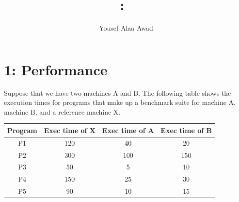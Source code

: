 \documentclass{article}
\title{
    \vspace{2in}
    \textmd{\textbf{\hmwkClass:\ \hmwkTitle}}\\
    \normalsize\vspace{0.1in}
    \vspace{3in}
}
\author{Yousef Alaa Awad}
\begin{document}
\maketitle
\pagebreak

\section{1: Performance}
Suppose that we have two machines A and B. The following table shows the execution times for programs that make up a benchmark suite for machine A, machine B, and a reference machine X.
\begin{table}[h]
  \centering
  \begin{tabular}{|c|c|c|c|}
    \hline
    Program & Exec time of X & Exec time of A & Exec time of B \\ \hline
    P1      & 120            & 40             & 20             \\ \hline
    P2      & 300            & 100            & 150            \\ \hline
    P3      & 50             & 5              & 10             \\ \hline
    P4      & 150            & 25             & 30             \\ \hline
    P5      & 90             & 10             & 15             \\ \hline
  \end{tabular}
\end{table}
\end{document}
